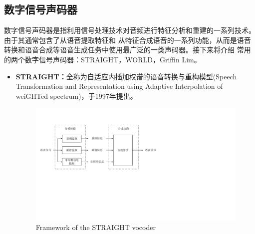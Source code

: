 \subsection{数字信号声码器}
数字信号声码器是指利用信号处理技术对音频进行特征分析和重建的一系列技术。由于其通常包含了从语音提取特征和
从特征合成语音的一系列功能，从而是语音转换和语音合成等语音生成任务中使用最广泛的一类声码器。接下来将介绍
常用的两个数字信号声码器：STRAIGHT，WORLD，Griffin Lim。

\begin{itemize}
    \item \textbf{STRAIGHT：}全称为自适应内插加权谱的语音转换与重构模型(Speech Transformation
    and Representation using Adaptive Interpolation of weiGHTed spectrum)，于1997年提出\cite{kawahara1997speech}。

    \begin{figure}[!htp]
        \centering
        \includegraphics[width=13cm,trim=10 160 260 40,clip]{figure/2_vocoder.pdf}
        {Framework of the STRAIGHT vocoder}
        \label{fig:vocoder}
    \end{figure}


\end{itemize}

